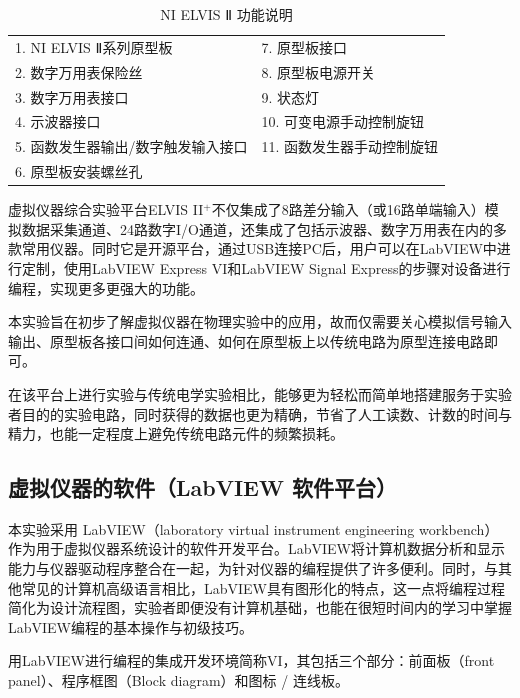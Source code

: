 \documentclass[UTF8]{article}
\theoremstyle{MyLineTheoremStyle} %
\theoremstyle{MyBlockTheoremStyle} %
\theoremstyle{MySubsubsectionStyle} %
\begin{document}
\begin{table}[H]\centering
    \caption{NI ELVIS Ⅱ 功能说明}
    \label{NI ELVIS Ⅱ 功能说明}
\begin{tabular}{ll}\toprule
    1. NI ELVIS Ⅱ系列原型板 &  7. 原型板接口 \\
    2. 数字万用表保险丝 & 8. 原型板电源开关 \\
    3. 数字万用表接口 & 9. 状态灯 \\
    4. 示波器接口 & 10. 可变电源手动控制旋钮 \\
    5. 函数发生器输出/数字触发输入接口 & 11. 函数发生器手动控制旋钮 \\
    6. 原型板安装螺丝孔 &  \\
    \bottomrule
\end{tabular}
\end{table}

虚拟仪器综合实验平台ELVIS II$ ^+ $不仅集成了8路差分输入（或16路单端输入）模拟数据采集通道、24路数字I/O通道，还集成了包括示波器、数字万用表在内的多款常用仪器。同时它是开源平台，通过USB连接PC后，用户可以在LabVIEW中进行定制，使用LabVIEW Express VI和LabVIEW Signal Express的步骤对设备进行编程，实现更多更强大的功能。	

本实验旨在初步了解虚拟仪器在物理实验中的应用，故而仅需要关心模拟信号输入输出、原型板各接口间如何连通、如何在原型板上以传统电路为原型连接电路即可。

在该平台上进行实验与传统电学实验相比，能够更为轻松而简单地搭建服务于实验者目的的实验电路，同时获得的数据也更为精确，节省了人工读数、计数的时间与精力，也能一定程度上避免传统电路元件的频繁损耗。

\subsection{虚拟仪器的软件（LabVIEW 软件平台）}

本实验采用 LabVIEW（laboratory virtual instrument engineering workbench）作为用于虚拟仪器系统设计的软件开发平台。LabVIEW将计算机数据分析和显示能力与仪器驱动程序整合在一起，为针对仪器的编程提供了许多便利。同时，与其他常见的计算机高级语言相比，LabVIEW具有图形化的特点，这一点将编程过程简化为设计流程图，实验者即便没有计算机基础，也能在很短时间内的学习中掌握LabVIEW编程的基本操作与初级技巧。

用LabVIEW进行编程的集成开发环境简称VI，其包括三个部分：前面板（front panel）、程序框图（Block diagram）和图标 / 连线板。
\end{document}
